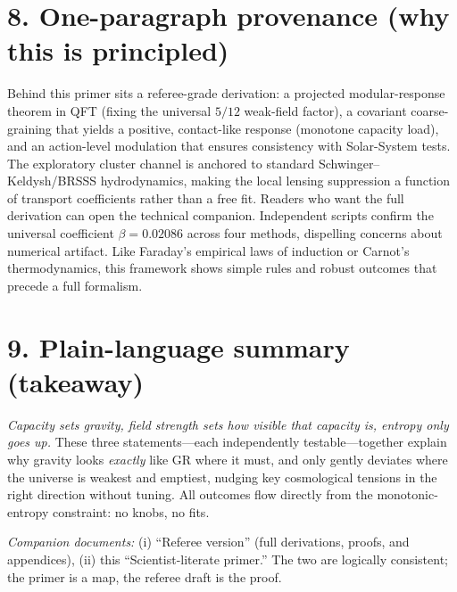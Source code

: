\documentclass[aps,prd,onecolumn,superscriptaddress,nofootinbib]{revtex4-2}
\begin{document}
\section*{8. One-paragraph provenance (why this is principled)}
Behind this primer sits a referee-grade derivation: a projected modular-response theorem in QFT (fixing the universal $5/12$ weak-field factor), a covariant coarse-graining that yields a positive, contact-like response (monotone capacity load), and an action-level modulation that ensures consistency with Solar-System tests. The exploratory cluster channel is anchored to standard Schwinger--Keldysh/BRSSS hydrodynamics, making the local lensing suppression a function of transport coefficients rather than a free fit. Readers who want the full derivation can open the technical companion.
Independent scripts confirm the universal coefficient $\beta = 0.02086$ across four methods, dispelling concerns about numerical artifact. Like Faraday's empirical laws of induction or Carnot's thermodynamics, this framework shows simple rules and robust outcomes that precede a full formalism.

\section*{9. Plain-language summary (takeaway)}
\emph{Capacity sets gravity, field strength sets how visible that capacity is, entropy only goes up.} These three statements---each independently testable---together explain why gravity looks \emph{exactly} like GR where it must, and only gently deviates where the universe is weakest and emptiest, nudging key cosmological tensions in the right direction without tuning.
All outcomes flow directly from the monotonic-entropy constraint: no knobs, no fits.

\bigskip
\noindent\textit{Companion documents:} (i) ``Referee version'' (full derivations, proofs, and appendices), (ii) this ``Scientist-literate primer.'' The two are logically consistent; the primer is a map, the referee draft is the proof.
\end{document}
